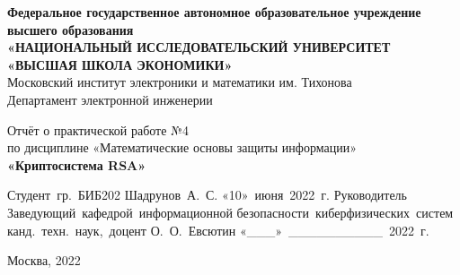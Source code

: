 \begin{titlepage}

\begin{center}
    
{\large\bf Федеральное‌ ‌государственное‌ ‌автономное‌ ‌образовательное‌ ‌учреждение‌ ‌высшего‌ образования\\}
{\large\bf «НАЦИОНАЛЬНЫЙ‌ ‌ИССЛЕДОВАТЕЛЬСКИЙ‌ ‌УНИВЕРСИТЕТ‌ «ВЫСШАЯ‌ ‌ШКОЛА‌ ‌ЭКОНОМИКИ»‌\\}
Московский‌ ‌институт‌ ‌электроники‌ ‌и‌ ‌математики‌ ‌им. Тихонова‌\\ 
Департамент‌ ‌электронной‌ ‌инженерии‌\\

\vfill

Отчёт о практической работе №4\\
по дисциплине «Математические основы защиты информации»\\
{\bf «Криптосистема RSA»‌}

\vfill
\vfill
\vfill

\hfill\vbox
{
\hbox{Студент гр. БИБ202}
\hbox{Шадрунов А. С.}
\hbox{«10» июня 2022 г.}
\hbox{Руководитель}
\hbox{Заведующий кафедрой информационной}
\hbox{безопасности киберфизических систем}
\hbox{канд. техн. наук, доцент}
\hbox{О. О. Евсютин}
\hbox{«\_\_\_» \_\_\_\_\_\_\_\_\_\_ 2022 г.}
}

\vfill

Москва, 2022
\end{center}

\end{titlepage}


